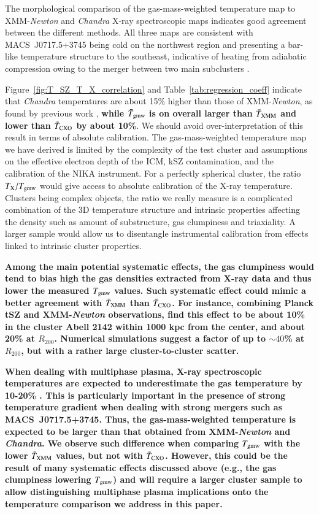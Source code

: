\documentclass[twocolumn,traditabstract]{aa}
\begin{document}
The morphological comparison of the gas-mass-weighted temperature map to XMM-\textit{Newton} and \textit{Chandra} X-ray spectroscopic maps indicates good agreement between the different methods. All three maps are consistent with \mbox{MACS~J0717.5+3745} being cold on the northwest region and presenting a bar-like temperature structure to the southeast, indicative of heating from adiabatic compression owing to the merger between two main subclusters \citep[see, e.g.,][]{Ma2009}.

Figure~\ref{fig:T_SZ_T_X_correlation} and Table~\ref{tab:regression_coeff} indicate that \textit{Chandra} temperatures are about 15\% higher than those of XMM-\textit{Newton}, as found by previous work \citep{Mahdavi2013,sch15}, {\bf while $\bar{T}_{\rm gmw}$ is on overall larger than $\bar{T}_{\rm XMM}$ and lower than $\bar{T}_{\rm CXO}$ by about 10\%}. We should avoid over-interpretation of this result in terms of absolute calibration. The gas-mass-weighted temperature map we have derived is limited by the complexity of the test cluster and  assumptions on the effective electron depth of the ICM, kSZ contamination, and the calibration of the NIKA instrument. For a perfectly spherical cluster, the ratio $T_{\rm X} / T_{\rm gmw}$ would give access to absolute calibration of the X-ray temperature. Clusters being complex objects, the ratio we really measure is a complicated combination of the 3D temperature structure and intrinsic properties affecting the density such as amount of substructure, gas clumpiness and triaxiality. A larger sample would allow us to disentangle instrumental calibration from effects linked to intrinsic cluster properties.

{\bf Among the main potential systematic effects, the gas clumpiness would tend to bias high the gas densities extracted from X-ray data and thus lower the measured $T_{\rm gmw}$ values. Such systematic effect could mimic a better agreement with $\bar{T}_{\rm XMM}$ than $\bar{T}_{\rm CXO}$. For instance, combining Planck tSZ \citep{Planck2015I} and XMM-\textit{Newton} observations, \citep{Tchernin2016} find this effect to be about 10\% in the cluster Abell 2142 within 1000 kpc from the center, and about 20\% at $R_{200}$. Numerical simulations \citep[e.g.,][]{Nagai2011,Zhuravleva2013,Vazza2013} suggest a factor of up to $\sim 40$\% at $R_{200}$, but with a rather large cluster-to-cluster scatter.}

{\bf When dealing with multiphase plasma, X-ray spectroscopic temperatures are expected to underestimate the gas temperature by 10-20\% \citep{Mathiesen2001,maz04}. This is particularly important in the presence of strong temperature gradient when dealing with strong mergers such as \mbox{MACS~J0717.5+3745}. Thus, the gas-mass-weighted temperature is expected to be larger than that obtained from XMM-\textit{Newton} and \textit{Chandra}. We observe such difference when comparing $T_{\rm gmw}$ with the lower $\bar{T}_{\rm XMM}$ values, but not with $\bar{T}_{\rm CXO}$. However, this could be the result of many systematic effects discussed above (e.g., the gas clumpiness lowering $T_{\rm gmw}$) and will require a larger cluster sample to allow distinguishing multiphase plasma implications onto the temperature comparison we address in this paper.}
\end{document}
